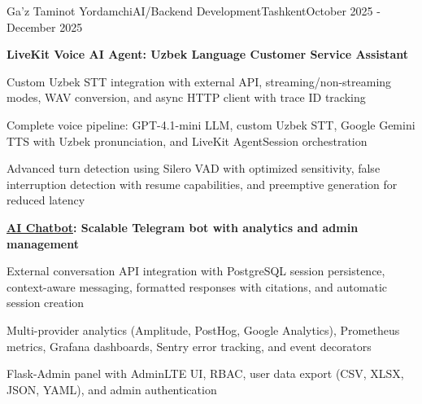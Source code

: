 \begin{resume_employer}{Ga'z Taminot Yordamchi}{AI/Backend Development}{Tashkent}{October 2025 - December 2025}

\textbf{LiveKit Voice AI Agent: Uzbek Language Customer Service Assistant}
\item 
\item Custom Uzbek STT integration with external API, streaming/non-streaming modes, WAV conversion, and async HTTP client with trace ID tracking
\item Complete voice pipeline: GPT-4.1-mini LLM, custom Uzbek STT, Google Gemini TTS with Uzbek pronunciation, and LiveKit AgentSession orchestration
\item Advanced turn detection using Silero VAD with optimized sensitivity, false interruption detection with resume capabilities, and preemptive generation for reduced latency

\vspace{\projectspacing}


\textbf{\href{https://t.me/hgtm_chatbot}{AI Chatbot}: Scalable Telegram bot with analytics and admin management}
\item External conversation API integration with PostgreSQL session persistence, context-aware messaging, formatted responses with citations, and automatic session creation
\item Multi-provider analytics (Amplitude, PostHog, Google Analytics), Prometheus metrics, Grafana dashboards, Sentry error tracking, and event decorators
\item Flask-Admin panel with AdminLTE UI, RBAC, user data export (CSV, XLSX, JSON, YAML), and admin authentication

\end{resume_employer}

